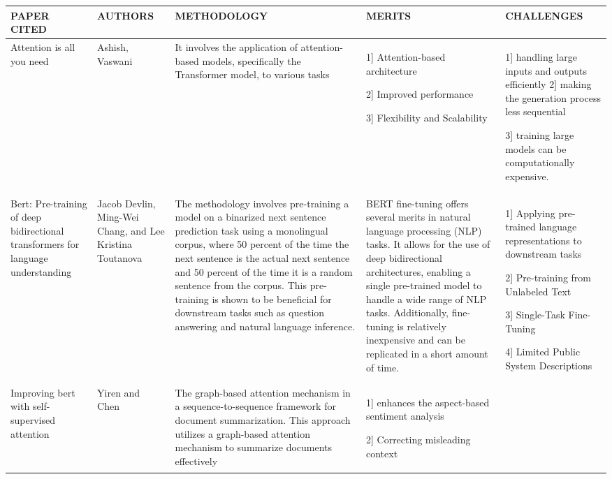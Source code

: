 \documentclass[conference]{IEEEtran}
\begin{document}
\begin{table}
\begin{center}
 \centering
    \begin{tabular}{ |p{2cm}|p{2cm}|p{4cm}|p{3cm}|p{4cm}| }
\hline
\centering PAPER CITED & \centering  AUTHORS & \centering METHODOLOGY &  \centering MERITS &  \centering CHALLENGES \arraybackslash \\ 
\hline
[21] Attention is all you need & Ashish, Vaswani & It involves the application of attention-based models, specifically the Transformer model, to various tasks & 1] Attention-based architecture

2]  Improved performance

3] Flexibility and Scalability 
 & 1] handling large inputs and outputs efficiently
2] making the generation process less sequential

3] training large models can be computationally expensive. \\
\hline
[23] Bert: Pre-training of deep bidirectional transformers for language understanding & Jacob Devlin, Ming-Wei Chang, and Lee Kristina Toutanova & The methodology involves pre-training a model on a binarized next sentence prediction task using a monolingual corpus, where 50 percent of the time the next sentence is the actual next sentence and 50 percent of the time it is a random sentence from the corpus. This pre-training is shown to be beneficial for downstream tasks such as question answering and natural language inference. & BERT fine-tuning offers several merits in natural language processing (NLP) tasks. It allows for the use of deep bidirectional architectures, enabling a single pre-trained model to handle a wide range of NLP tasks. Additionally, fine-tuning is relatively inexpensive and can be replicated in a short amount of time. & 1] Applying pre-trained language representations to downstream tasks

2] Pre-training from Unlabeled Text

3] Single-Task Fine-Tuning

4]  Limited Public System Descriptions
 \\
\hline
[24] Improving bert with self-supervised attention & Yiren and Chen & The graph-based attention mechanism in a sequence-to-sequence framework for document summarization. This approach utilizes a graph-based attention mechanism to summarize documents effectively & 1] enhances the aspect-based sentiment analysis

2] Correcting misleading context


\end{tabular}
\end{center}
\end{table}
\end{document}
